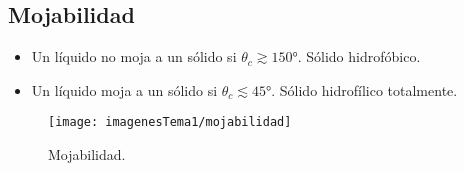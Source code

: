 \subsection{Mojabilidad}
\begin{itemize}
	\item Un líquido no moja a un sólido si $\theta_c \gtrsim \ang{150} $. Sólido hidrofóbico.
	\item Un líquido moja a un sólido si $\theta_c  \lesssim \ang{45}$. Sólido hidrofílico totalmente.
\end{itemize}
\begin{figure}[H]
	\centering
	\texttt{[image: imagenesTema1/mojabilidad]}
	\caption{Mojabilidad.}
	\label{fig:mojabilidad}
\end{figure}
